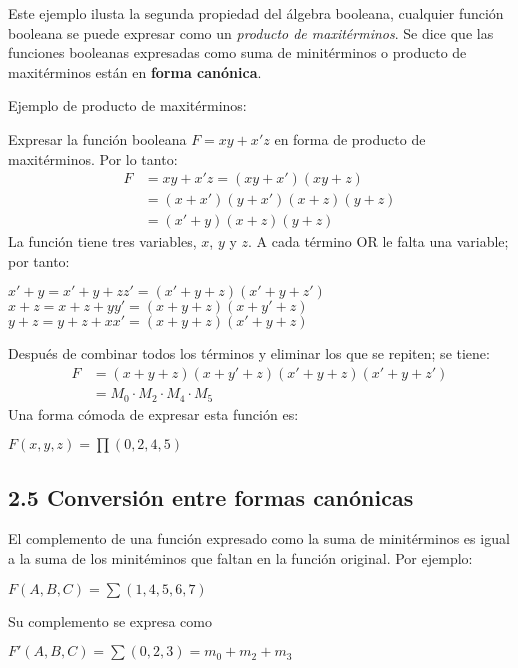 \documentclass{article}
\begin{document}
Este ejemplo ilusta la segunda propiedad del \'{a}lgebra booleana, cualquier funci\'{o}n booleana se puede
expresar como un \textit{producto de maxit\'{e}rminos}. Se dice que las funciones booleanas 
expresadas como suma de minit\'{e}rminos o producto de maxit\'{e}rminos est\'{a}n en \textbf{forma can\'{o}nica}.
\medbreak

Ejemplo de producto de maxit\'{e}rminos:
\begin{flushleft}
    Expresar la funci\'{o}n booleana $F = xy + x'z$ en forma de producto de maxit\'{e}rminos. Por lo tanto:
    \begin{align*}
        F &= xy + x'z = (xy + x')(xy + z) \\
        &= (x + x')(y + x')(x + z)(y + z) \\
        &= (x' + y)(x + z)(y + z)
    \end{align*}
    La funci\'{o}n tiene tres variables, $x$, $y$ y $z$. A cada t\'{e}rmino OR le falta una variable; por tanto:
    \begin{center}
        $x' + y = x' + y + zz' = (x' + y + z)(x' + y + z')$ \\
        $x + z = x + z + yy' = (x + y + z)(x + y' + z)$ \\
        $y + z = y + z + xx' = (x + y + z)(x' + y + z)$
    \end{center}
    Despu\'{e}s de combinar todos los t\'{e}rminos y eliminar los que se repiten; se tiene:
    \begin{align*}
        F &= (x + y + z)(x + y' + z)(x' + y + z)(x' + y + z') \\
        &= M_0 \cdot M_2 \cdot M_4 \cdot M_5
    \end{align*}
    Una forma c\'{o}moda de expresar esta funci\'{o}n es:
    \begin{center}
        $F(x, y, z) = \prod(0, 2, 4, 5)$
    \end{center}
\end{flushleft}

\subsection*{2.5 Conversi\'{o}n entre formas can\'{o}nicas}
El complemento de una funci\'{o}n expresado como la suma de minit\'{e}rminos es igual a la suma
de los minit\'{e}minos que faltan en la funci\'{o}n original. Por ejemplo:

\begin{center}
    $F(A, B, C) = \sum(1, 4, 5, 6, 7)$
\end{center}
\begin{flushleft}
    Su complemento se expresa como
\end{flushleft}
\begin{center}
    $F'(A, B, C) = \sum(0, 2, 3) = m_0 + m_2 + m_3$
\end{center}
\end{document}
